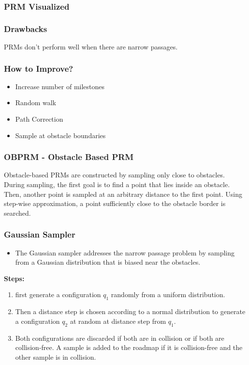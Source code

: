 \documentclass{beamer}
\begin{document}
  \begin{frame}
    \frametitle{PRM Visualized}
  
  \end{frame}

  \begin{frame}
    \frametitle{Drawbacks}
    PRMs don't perform well when there are narrow passages.
  
  \end{frame}

  \begin{frame}
    \frametitle{How to Improve?}
    \begin{itemize}
      \item Increase number of milestones
      \item Random walk
      \item Path Correction
      \item Sample at obstacle boundaries
    \end{itemize}
    
  
  \end{frame}

  \begin{frame}
    \frametitle{OBPRM - Obstacle Based PRM}
    Obstacle-based PRMs are constructed by sampling only close to obstacles. During sampling, the first goal is to find a point that lies inside an obstacle. Then, another point is sampled at an arbitrary distance to the first point. Using step-wise approximation, a point sufficiently close to the obstacle border is searched.
  
  \end{frame}

  \begin{frame}
    \frametitle{Gaussian Sampler}
    \begin{itemize}
      \item The Gaussian sampler addresses the narrow passage problem by sampling from a Gaussian distribution that is biased near the obstacles.
    \end{itemize}

    \textbf{Steps:}
    \begin{enumerate}
      \item first generate a configuration $q_{1}$ randomly from a uniform distribution.
      \item Then a distance step is chosen according to a normal distribution to generate a configuration $q_{2}$ at random at distance step from $q_{1}$.
      \item Both configurations are discarded if both are in collision or if both are collision-free. A sample is added to the roadmap if it is collision-free and the other sample is in collision.
    \end{enumerate}
  
  \end{frame}
\end{document}
